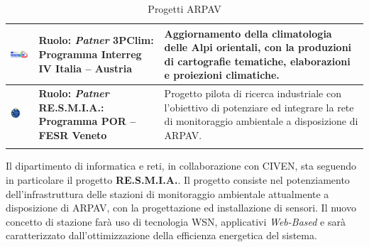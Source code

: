 \begin{longtable}{ p{} | p{} | p{}}
\midrule
\vfill \includegraphics[scale=0.7]{./capitoli/capitolo1/img/interr} & \vfill \textbf{{\color{Plum}Ruolo}: \textit{Patner}} \newline \vfill \textbf{{\color{ForestGreen}3PClim}: Programma Interreg IV Italia – Austria} &   Aggiornamento della climatologia delle Alpi orientali, con la produzioni di cartografie tematiche, elaborazioni e proiezioni climatiche. \\
\midrule
\vfill \includegraphics[scale=0.7]{./capitoli/capitolo1/img/resmia} & \vfill \textbf{{\color{Plum}Ruolo}: \textit{Patner}} \newline \vfill \textbf{{\color{ForestGreen}RE.S.M.I.A.}: Programma POR – FESR Veneto} & Progetto pilota di ricerca industriale con l’obiettivo di potenziare ed integrare la rete di monitoraggio ambientale a disposizione di ARPAV.\\
\bottomrule
\caption{Progetti ARPAV}
\end{longtable}

Il dipartimento di informatica e reti, in collaborazione con CIVEN, sta seguendo in particolare il progetto \textbf{RE.S.M.I.A.}. Il progetto consiste nel potenziamento dell'infrastruttura delle stazioni di monitoraggio ambientale attualmente a disposizione di ARPAV, con la progettazione ed installazione di sensori. Il nuovo concetto di stazione farà uso di tecnologia WSN, applicativi \textit{Web-Based} e sarà caratterizzato dall'ottimizzazione della efficienza energetica del sistema. \\


